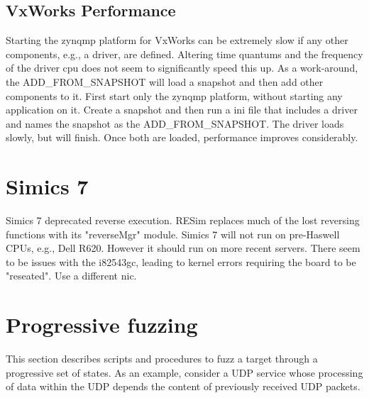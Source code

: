 \documentclass[titlepage]{article}
\begin{document}
\begin{appendices}
\subsection{VxWorks Performance}
Starting the zynqmp platform for VxWorks can be extremely slow if any other components, e.g., a driver, are defined.  Altering time quantums and the frequency of
the driver cpu does not seem to significantly speed this up.  As a work-around, the ADD\_FROM\_SNAPSHOT will load a snapshot and then add other components to it.
First start only the zynqmp platform, without starting any application on it.  Create a snapshot and then run a ini file that includes a driver and names the snapshot
as the ADD\_FROM\_SNAPSHOT.  The driver loads slowly, but will finish.  Once both are loaded, performance improves considerably.

\section{Simics 7}
Simics 7 deprecated reverse execution.  RESim replaces much of the lost reversing functions with its "reverseMgr" module.
Simics 7 will not run on pre-Haswell CPUs, e.g., Dell R620.  However it should run on more recent servers.
There seem to be issues with the i82543gc, leading to kernel errors requiring the board to be "reseated".  Use a different nic.

\section{Progressive fuzzing}
This section describes scripts and procedures to fuzz a target through a progressive set of states.
As an example, consider a UDP service whose processing of data within the UDP depends the content of previously received UDP packets.

\end{appendices}
\end{document}
